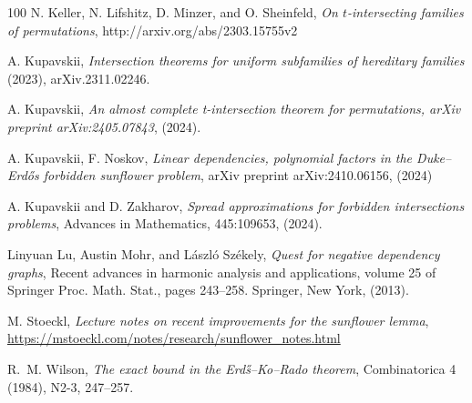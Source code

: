 \documentclass[11pt,letterpaper]{amsart}
\begin{document}
\begin{thebibliography}{100}
 N. Keller, N. Lifshitz, D. Minzer, and O. Sheinfeld, {\it On $t$-intersecting families of permutations}, http://arxiv.org/abs/2303.15755v2

 A. Kupavskii, {\it Intersection theorems for uniform subfamilies of hereditary families} (2023), arXiv.2311.02246.


 A. Kupavskii, {\it An almost complete t-intersection theorem for permutations, arXiv preprint arXiv:2405.07843}, (2024).


 A. Kupavskii, F. Noskov, {\it Linear dependencies, polynomial factors in the Duke--Erd\H os forbidden sunflower problem}, arXiv preprint arXiv:2410.06156, (2024)


 A. Kupavskii and D. Zakharov, {\it Spread approximations for forbidden intersections problems}, Advances in Mathematics, 445:109653, (2024).

 Linyuan Lu, Austin Mohr, and L\'aszl\'o  Sz\'ekely, {\it Quest for negative dependency graphs}, Recent advances in harmonic analysis and applications, volume 25
of Springer Proc. Math. Stat., pages 243–258. Springer, New York, (2013).


 M. Stoeckl, {\it Lecture notes on recent improvements for the sunflower lemma}, \url {https://mstoeckl.com/notes/research/sunflower_notes.html}

 R.~M. Wilson, {\it The exact bound in the Erd\H s--Ko--Rado theorem}, Combinatorica 4 (1984), N2-3, 247--257.

\end{thebibliography}
\end{document}

